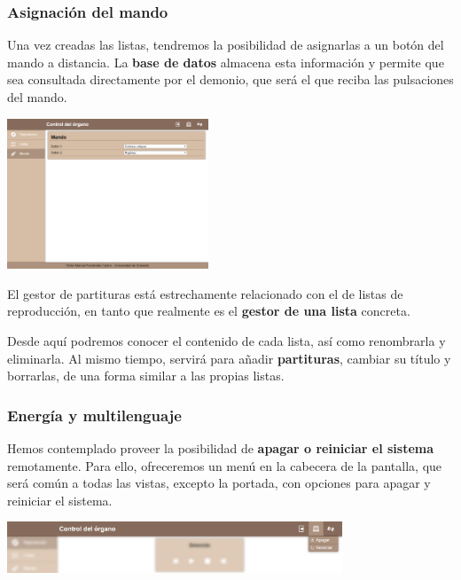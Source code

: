 \documentclass[10pt,a4paper]{article}
\begin{document}
	\clearpage
	\subsubsection*{Asignación del mando}
	
	Una vez creadas las listas, tendremos la posibilidad de asignarlas a un botón del mando a distancia. La \textbf{base de datos} almacena esta información y permite que sea consultada directamente por el demonio, que será el que reciba las pulsaciones del mando.
	
	\begin{multicols}{2}
		\noindent
		\begin{center}
			\includegraphics[width=0.45\textwidth]{images/cap_mando} 
		\end{center}
		\columnbreak
		El gestor de partituras está estrechamente relacionado con el de listas de reproducción, en tanto que realmente es el \textbf{gestor de una lista} concreta. 
		
		Desde aquí podremos conocer el contenido de cada lista, así como renombrarla y eliminarla. Al mismo tiempo, servirá para añadir \textbf{partituras}, cambiar su título y borrarlas, de una forma similar a las propias listas.
	\end{multicols}
	
	\subsubsection*{Energía y multilenguaje}
	
	Hemos contemplado proveer la posibilidad de\textbf{ apagar o reiniciar el sistema} remotamente. Para ello, ofreceremos un menú en la cabecera de la pantalla, que será común a todas las vistas, excepto la portada, con opciones para apagar y reiniciar el sistema.
	
	\begin{center}
		\includegraphics[width=0.75\textwidth]{images/cap_repr_apagar} 
	\end{center}
	
\end{document}
